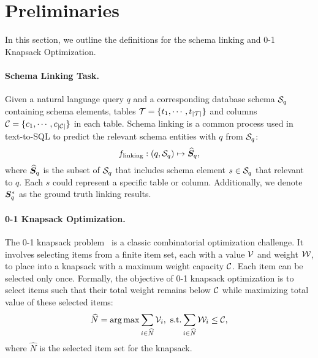 

\section{Preliminaries}
\label{sec: Preliminaries}
In this section, we outline the definitions for the schema linking and 0-1 Knapsack Optimization.
\paragraph{Schema Linking Task.}\label{sec: schema linking}
Given a natural language query $q$ and a corresponding database schema ${\mathcal{S}}_q$ containing schema elements, tables ${\mathcal{T}} = \{t_1, \cdots, t_{|{\mathcal{T}}|}\}$ and columns ${\mathcal{C}} = \{c_1, \cdots, c_{|{\mathcal{C}}|}\}$ in each table. Schema linking is a common process used in text-to-SQL to predict the relevant schema entities with $q$ from ${\mathcal{S}}_q$:
\begin{equation}
f_{\text{linking}}: (q, {\mathcal{S}}_q) \mapsto \widehat{{\bm{S}}}_q,
\end{equation}
where $\widehat{{\bm{S}}}_q$ is the subset of ${\mathcal{S}}_q$ that includes schema element $s \in {\mathcal{S}}_q$ that relevant to $q$. Each $s$ could represent a specific table or column. Additionally, we denote ${\bm{S}}_q^*$ as the ground truth linking results. 


\paragraph{0-1 Knapsack Optimization.}\label{sec:0-1 Knapsack Problem}
The 0-1 knapsack problem~\cite{freville2004multidimensional} is a classic combinatorial optimization challenge. It involves selecting items from a finite item set, each with a value ${\mathcal{V}}$ and weight ${\mathcal{W}}$, to place into a knapsack with a maximum weight capacity ${\mathcal{C}}$. Each item can be selected only once.
Formally, the objective of 0-1 knapsack optimization is to select items such that their total weight remains below ${\mathcal{C}}$ while maximizing total value of these selected items:
\begin{equation} \label{equ: 0-1 Knapsack Problem}
\widehat{N} = \arg \max \sum_{i \in \widehat{N}} {\mathcal{V}}_i, \ \text{s.t.} \sum_{i \in \widehat{N}} {\mathcal{W}}_i \leq {\mathcal{C}},
\end{equation} where $\widehat{N}$ is the selected item set for the knapsack. 
